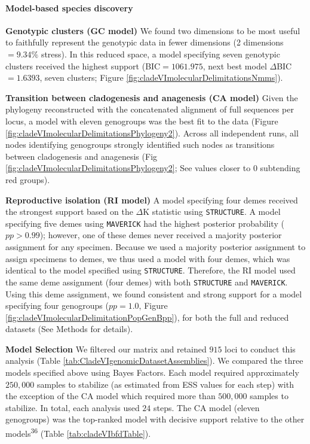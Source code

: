 \documentclass[
  11pt,
]{article}
\begin{document}
\hypertarget{model-based-species-discovery-11}{%
\paragraph{Model-based species discovery}\label{model-based-species-discovery-11}}

\textbf{Genotypic clusters (GC model)} We found two dimensions to be most useful to faithfully represent the genotypic data in fewer dimensions (2 dimensions \(= 9.34\%\) stress). In this reduced space, a model specifying seven genotypic clusters received the highest support (BIC\(=1061.975\), next best model \(\Delta\)BIC\(=1.6393\), seven clusters; Figure \ref{fig:cladeVImolecularDelimitationsNmms}).

\textbf{Transition between cladogenesis and anagenesis (CA model)} Given the phylogeny reconstructed with the concatenated alignment of full sequences per locus, a model with eleven genogroups was the best fit to the data (Figure \ref{fig:cladeVImolecularDelimitationsPhylogeny2}). Across all independent runs, all nodes identifying genogroups strongly identified such nodes as transitions between cladogenesis and anagenesis (Fig \ref{fig:cladeVImolecularDelimitationsPhylogeny2}; See values closer to \(0\) subtending red groups).

\textbf{Reproductive isolation (RI model)} A model specifying four demes received the strongest support based on the \(\Delta\)K statistic using \texttt{STRUCTURE}. A model specifying five demes using \texttt{MAVERICK} had the highest posterior probability (\(pp>0.99\)); however, one of these demes never received a majority posterior assignment for any specimen. Because we used a majority posterior assignment to assign specimens to demes, we thus used a model with four demes, which was identical to the model specified using \texttt{STRUCTURE}. Therefore, the RI model used the same deme assignment (four demes) with both \texttt{STRUCTURE} and \texttt{MAVERICK}. Using this deme assignment, we found consistent and strong support for a model specifying four genogroups (\(pp=1.0\), Figure \ref{fig:cladeVImolecularDelimitationPopGenBpp}), for both the full and reduced datasets (See Methods for details).

\textbf{Model Selection} We filtered our matrix and retained \(915\) loci to conduct this analysis (Table \ref{tab:CladeVIgenomicDatasetAssemblies}). We compared the three models specified above using Bayes Factors. Each model required approximately \(250,000\) samples to stabilize (as estimated from ESS values for each step) with the exception of the CA model which required more than \(500,000\) samples to stabilize. In total, each analysis used \(24\) steps. The CA model (eleven genogroups) was the top-ranked model with decisive support relative to the other models\textsuperscript{36} (Table \ref{tab:cladeVIbfdTable}).
\end{document}
